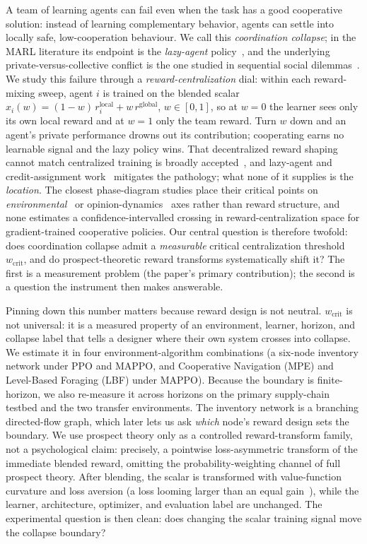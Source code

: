 \documentclass[letterpaper]{article} %
\theoremstyle{plain}
\newcommand{\wcrit}{w_{\mathrm{crit}}}
\begin{document}
A team of learning agents can fail even when the task has a good cooperative solution: instead of
learning complementary behavior, agents can settle into locally safe, low-cooperation behaviour.
We call this \emph{coordination collapse};
in the MARL literature its endpoint is the \emph{lazy-agent}
policy~\citep{liu2023lazy,peng2023curo}, and the underlying private-versus-collective conflict is
the one studied in sequential social dilemmas~\citep{leibo2017multi}. We study this failure through
a \emph{reward-centralization} dial: within each reward-mixing sweep, agent $i$ is trained on the
blended scalar $x_i(w)=(1-w)\,r_i^{\mathrm{local}}+w\,r^{\mathrm{global}}$, $w\in[0,1]$, so at
$w{=}0$ the learner sees only its own local reward and at $w{=}1$ only the team reward. Turn $w$
down and an agent's private performance drowns out its contribution; cooperating earns no
learnable signal and the lazy policy wins. That decentralized reward shaping cannot match
centralized training is broadly accepted~\citep{dmarl2025}, and lazy-agent and credit-assignment
work~\citep{liu2023lazy,peng2023curo,sunehag2018vdn,rashid2018qmix,foerster2018counterfactual}
mitigates the pathology; what none of it supplies is the \emph{location}. The closest phase-diagram
studies place their critical points on \emph{environmental}~\citep{yamaguchi2025} or
opinion-dynamics~\citep{capannoli2026phase} axes rather than reward structure, and none estimates a
confidence-intervalled crossing in reward-centralization space for gradient-trained cooperative
policies. Our central question is therefore twofold: does coordination collapse admit a
\emph{measurable} critical centralization threshold $\wcrit$, and do prospect-theoretic reward
transforms systematically shift it? The first is a measurement problem (the paper's primary
contribution); the second is a question the instrument then makes answerable.

Pinning down this number matters because reward design is not neutral. $\wcrit$ is not universal: it
is a measured property of an environment, learner, horizon, and collapse label that tells a designer
where their own system crosses into collapse. We estimate it in four environment-algorithm
combinations (a six-node inventory network under PPO and MAPPO, and Cooperative Navigation (MPE) and
Level-Based Foraging (LBF) under MAPPO). Because the boundary is finite-horizon, we also re-measure it
across horizons on the primary supply-chain testbed and the two transfer environments. The inventory network is a branching directed-flow graph, which later lets us ask
\emph{which} node's reward design sets the boundary. We use prospect theory only as a controlled
reward-transform family, not a psychological claim: precisely, a pointwise loss-asymmetric transform
of the immediate blended reward, omitting the probability-weighting channel of full prospect
theory. After blending, the scalar is transformed with value-function curvature and loss aversion (a
loss looming larger than an equal gain~\citep{kahneman1979,tversky1992}), while the learner,
architecture, optimizer, and evaluation label are unchanged. The experimental question is then clean: does changing the scalar training
signal move the collapse boundary?
\end{document}

